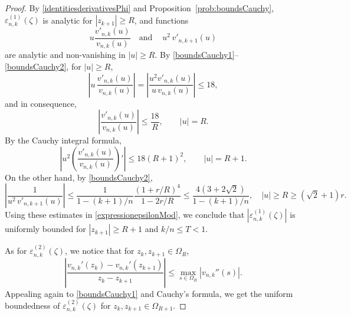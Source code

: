 \documentclass[10pt,a4paper]{amsart}
\theoremstyle{plain}
\theoremstyle{remark}
\begin{document}
\begin{proof}
By \eqref{identitiesderivativesPhi} and Proposition~\ref{prob:boundsCauchy}, $\varepsilon_{n,k}^{(1)}(\zeta)$ is analytic for $|z_{k+1}|\ge R$, and functions
$$
u\frac{ v'_{n,k}(u)}{  v_{n,k}(u)} \quad \text{and} \quad \ u^2\,   v'_{n,k+1}(u) 
$$
are analytic and non-vanishing in $|u|\ge R$. By \eqref{boundsCauchy1}--\eqref{boundsCauchy2}, for $|u|\ge R$,
$$
 \left| u\, \frac{ v'_{n,k}(u)}{  v_{n,k}(u)} \right|= \left|  \frac{u^2    v'_{n,k}(u)}{ u\,  v_{n,k}(u)} \right|\le 18,
$$
and in consequence,
$$
\left| \frac{  v'_{n,k}(u)}{  v_{n,k}(u)} \right|\le \frac{18}{R},  \qquad |u|=R.
$$
By the Cauchy integral formula,
\begin{equation}
    \label{estimate1onPhi}
\left| u^2  \left( \frac{ v'_{n,k}(u)}{  v_{n,k}(u)} \right)'\right|\le 18 (R+1)^2,  \qquad |u|=R+1.
\end{equation}
On the other hand, by \eqref{boundsCauchy2},
\begin{equation}
    \label{boundPhi}
\left| \frac{1}{ u^2\,    v'_{n, k+1}(u) } \right| \le \frac{1}{1-(k+1)/n}\frac{(1+r/R)^4}{1-2r/R}\le \frac{4(3+2 \sqrt{2})}{1-(k+1)/n}, \quad |u|\ge R\ge (\sqrt{2}+1)r. 
\end{equation}
Using these estimates in \eqref{expressionepsilonMod}, we conclude that $\left| \varepsilon_{n,k}^{(1)}(\zeta)\right|$ is uniformly bounded for $|z_{k+1}|\ge R+1$ and $k/n\le T<1$. 

As for $\varepsilon_{n,k}^{(2)} (\zeta)$, we notice that for $z_k, z_{k+1}\in \Omega_R$,
$$
\left|  \frac{ v_{n, k}' \left( z_k \right)- v_{n,k}'\left( z_{k+1} \right)}{    z_k-z_{k+1} }\right|  \leq \max_{s\in \Omega_R} \left| v_{n,k}''\left( s \right)\right| .
$$
Appealing again to \eqref{boundsCauchy1} and Cauchy's formula, we get the uniform boundedness of $\varepsilon_{n,k}^{(2)} (\zeta)$ for  $z_k, z_{k+1}\in \Omega_{R+1}$.


\end{proof}
\end{document}
